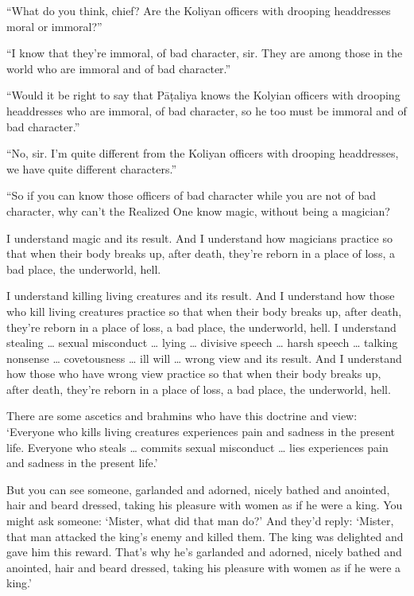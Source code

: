 \documentclass[12pt,openany]{book}%
\begin{document}
“What do you think, chief? Are the Koliyan officers with drooping headdresses moral or immoral?” 

“I know that they’re immoral, of bad character, sir. They are among those in the world who are immoral and of bad character.” 

“Would it be right to say that \textsanskrit{Pāṭaliya} knows the Kolyian officers with drooping headdresses who are immoral, of bad character, so he too must be immoral and of bad character.” 

“No, sir. I’m quite different from the Koliyan officers with drooping headdresses, we have quite different characters.” 

“So if you can know those officers of bad character while you are not of bad character, why can’t the Realized One know magic, without being a magician? 

I understand magic and its result. And I understand how magicians practice so that when their body breaks up, after death, they’re reborn in a place of loss, a bad place, the underworld, hell. 

I understand killing living creatures and its result. And I understand how those who kill living creatures practice so that when their body breaks up, after death, they’re reborn in a place of loss, a bad place, the underworld, hell. I understand stealing … sexual misconduct … lying … divisive speech … harsh speech … talking nonsense … covetousness … ill will … wrong view and its result. And I understand how those who have wrong view practice so that when their body breaks up, after death, they’re reborn in a place of loss, a bad place, the underworld, hell. 

There are some ascetics and brahmins who have this doctrine and view: ‘Everyone who kills living creatures experiences pain and sadness in the present life. Everyone who steals … commits sexual misconduct … lies experiences pain and sadness in the present life.’ 

But you can see someone, garlanded and adorned, nicely bathed and anointed, hair and beard dressed, taking his pleasure with women as if he were a king. You might ask someone: ‘Mister, what did that man do?’ And they’d reply: ‘Mister, that man attacked the king’s enemy and killed them. The king was delighted and gave him this reward. That’s why he’s garlanded and adorned, nicely bathed and anointed, hair and beard dressed, taking his pleasure with women as if he were a king.’ 
\end{document}
